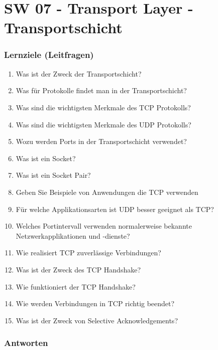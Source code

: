 \part{SW 07 - Transport Layer - Transportschicht}
\section{Lernziele (Leitfragen)}
\begin{enumerate}
    \item Was ist der Zweck der Transportschicht?
    \item Was für Protokolle findet man in der Transportschicht?
    \item Was sind die wichtigsten Merkmale des TCP Protokolls?
    \item Was sind die wichtigsten Merkmale des UDP Protokolls?
    \item Wozu werden Ports in der Transportschicht verwendet?
    \item Was ist ein Socket?
    \item Was ist ein \flqq{}Socket Pair\frqq?
    \item Geben Sie Beispiele von Anwendungen die TCP verwenden
    \item Für welche Applikationsarten ist UDP besser geeignet als TCP?
    \item Welches Portintervall verwenden normalerweise bekannte Netzwerkapplikationen und -dienste?
    \item Wie realisiert TCP zuverlässige Verbindungen?
    \item Was ist der Zweck des TCP Handshake?
    \item Wie funktioniert der TCP Handshake?
    \item Wie werden Verbindungen in TCP richtig beendet?
    \item Was ist der Zweck von \flqq{}Selective Acknowledgements\frqq?
\end{enumerate}

\section{Antworten}
